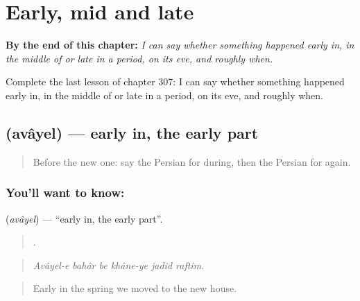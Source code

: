 
\chapter{Early, mid and late}
\label{ch:fa-early-mid-and-late}

\begin{chapteropening}
\textbf{By the end of this chapter:} \emph{I can say whether something happened early in, in the middle of or late in a period, on its eve, and roughly when.}

Complete the last lesson of chapter 307: I can say whether something happened early in, in the middle of or late in a period, on its eve, and roughly when.
\end{chapteropening}

\section[\texorpdfstring{\fa{اوایل} (avâyel)}{اوایل (avâyel)}]{ (avâyel) — early in, the early part}

\label{lesson:FA-C307-avayel}



\begin{quote}
Before the new one: say the Persian for during, then the Persian for again.
\end{quote}

\subsection*{You'll want to know: }
\textbf{} (\emph{avâyel}) — \textquotedblleft{}early in, the early part\textquotedblright{}.

\begin{quote}
     .
\end{quote}

\begin{quote}
\emph{Avâyel-e bahâr be khâne-ye jadid raftim.}
\end{quote}

\begin{quote}
Early in the spring we moved to the new house.
\end{quote}

